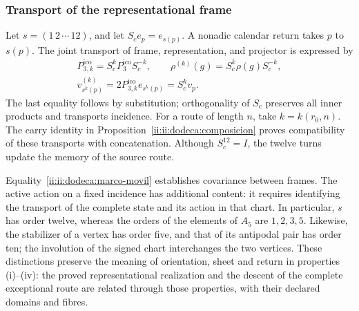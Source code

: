 \subsubsection{Transport of the representational frame}
\label{ii:ii:dodeca:marco}
Let \(s=(1\,2\,\cdots\,12)\), and let \(S_ce_p=e_{s(p)}\).
A nonadic calendar return takes \(p\) to \(s(p)\). The joint
transport of frame, representation, and projector is expressed by
\begin{equation}
 \begin{gathered}
 P_{3,k}^{\mathrm{ico}}=S_c^kP_3^{\mathrm{ico}}S_c^{-k},\qquad
 \rho^{(k)}(g)=S_c^k\rho(g)S_c^{-k},\\
 v^{(k)}_{s^k(p)}=2P_{3,k}^{\mathrm{ico}}e_{s^k(p)}=S_c^kv_p.
 \end{gathered}
 \label{ii:ii:dodeca:marco-movil}
\end{equation}
The last equality follows by substitution; orthogonality of
\(S_c\) preserves all inner products and transports
incidence. For a route of length \(n\), take
\(k=k(r_0,n)\). The carry identity in
Proposition~\ref{ii:ii:dodeca:composicion} proves compatibility of
these transports with concatenation. Although \(S_c^{12}=I\),
the twelve turns update the memory of the source route.

Equality~\eqref{ii:ii:dodeca:marco-movil} establishes covariance between
frames. The active action on a fixed incidence has additional
content: it requires identifying the transport of the complete state and its
action in that chart. In particular, \(s\) has order twelve, whereas
the orders of the elements of \(A_5\) are \(1,2,3,5\).
Likewise, the stabilizer of a vertex has order five, and that of its
antipodal pair has order ten; the involution of the signed chart
interchanges the two vertices. These distinctions preserve the meaning
of orientation, sheet and return in properties (i)--(iv): the
proved representational realization and the descent of the complete
exceptional route are related through those properties, with their
declared domains and fibres.




